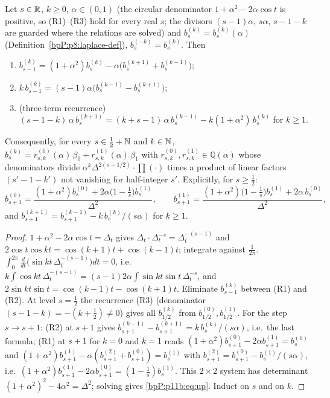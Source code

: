 \begin{lemma}\label{bpP:p11b:laplace-red}
Let $s\in\mathbb{R}$, $k\ge0$, $\alpha\in(0,1)$ (the circular denominator $1+\alpha^2-2\alpha\cos t$ is positive, so (R1)--(R3) hold for every real $s$; the divisors $(s-1)\alpha$, $s\alpha$, $s-1-k$ are guarded where the relations are solved) and $b_s^{(k)}=b_s^{(k)}(\alpha)$ (Definition~\ref{bpP:p8:laplace-def}), $b_s^{(-k)}=b_s^{(k)}$. Then
\begin{enumerate}[label=(R\arabic*)]
\item $b_{s-1}^{(k)}=(1+\alpha^2)b_s^{(k)}-\alpha\big(b_s^{(k+1)}+b_s^{(k-1)}\big)$;
\item $k\,b_{s-1}^{(k)}=(s-1)\alpha\big(b_s^{(k-1)}-b_s^{(k+1)}\big)$;
\item (three-term recurrence) $(s-1-k)\,\alpha\,b_s^{(k+1)}=(k+s-1)\,\alpha\,b_s^{(k-1)}-k(1+\alpha^2)\,b_s^{(k)}$ for $k\ge1$.
\end{enumerate}
Consequently, for every $s\in\tfrac12+\mathbb{N}$ and $k\in\mathbb{N}$, $b_s^{(k)}=r_{s,k}^{(0)}(\alpha)\,\beta_0+r_{s,k}^{(1)}(\alpha)\,\beta_1$ with $r^{(0)}_{s,k},r^{(1)}_{s,k}\in\mathbb Q(\alpha)$ whose denominators divide $\alpha^{k}\Delta^{2(s-1/2)}\cdot\prod(\cdot)$ times a product of linear factors $(s'-1-k')$ not vanishing for half-integer $s'$. Explicitly, for $s\ge\tfrac12$:
\begin{equation}\label{bpP:p11b:eq:up}
b_{s+1}^{(0)}=\frac{(1+\alpha^2)b_s^{(0)}+2\alpha\big(1-\tfrac1s\big)b_s^{(1)}}{\Delta^2},\qquad
b_{s+1}^{(1)}=\frac{(1+\alpha^2)\big(1-\tfrac1s\big)b_s^{(1)}+2\alpha\,b_s^{(0)}}{\Delta^2},
\end{equation}
and $b_{s+1}^{(k+1)}=b_{s+1}^{(k-1)}-k\,b_s^{(k)}/(s\alpha)$ for $k\ge1$.
\end{lemma}
\begin{proof}
\label{stepP:p11b:lr-1} $1+\alpha^2-2\alpha\cos t=\Delta_t$ gives $\Delta_t\cdot\Delta_t^{-s}=\Delta_t^{-(s-1)}$ and $2\cos t\cos kt=\cos(k+1)t+\cos(k-1)t$; integrate against $\frac1{2\pi}$.
\label{stepP:p11b:lr-2} $\int_0^{2\pi}\frac{d}{dt}\big(\sin kt\,\Delta_t^{-(s-1)}\big)dt=0$, i.e.\ $k\int\cos kt\,\Delta_t^{-(s-1)}=(s-1)2\alpha\int\sin kt\sin t\,\Delta_t^{-s}$, and $2\sin kt\sin t=\cos(k-1)t-\cos(k+1)t$.
\label{stepP:p11b:lr-3} Eliminate $b_{s-1}^{(k)}$ between (R1) and (R2).
\label{stepP:p11b:lr-red} At level $s=\tfrac12$ the recurrence (R3) (denominator $(s-1-k)=-(k+\tfrac12)\ne0$) gives all $b_{1/2}^{(k)}$ from $b_{1/2}^{(0)},b_{1/2}^{(1)}$. For the step $s\to s+1$: (R2) at $s+1$ gives $b_{s+1}^{(k-1)}-b_{s+1}^{(k+1)}=k\,b_s^{(k)}/(s\alpha)$, i.e.\ the last formula; (R1) at $s+1$ for $k=0$ and $k=1$ reads $(1+\alpha^2)b_{s+1}^{(0)}-2\alpha b_{s+1}^{(1)}=b_s^{(0)}$ and $(1+\alpha^2)b_{s+1}^{(1)}-\alpha(b_{s+1}^{(2)}+b_{s+1}^{(0)})=b_s^{(1)}$ with $b^{(2)}_{s+1}=b_{s+1}^{(0)}-b_s^{(1)}/(s\alpha)$, i.e.\ $(1+\alpha^2)b_{s+1}^{(1)}-2\alpha b_{s+1}^{(0)}=(1-\frac1s)b_s^{(1)}$. This $2\times2$ system has determinant $(1+\alpha^2)^2-4\alpha^2=\Delta^2$; solving gives \eqref{bpP:p11b:eq:up}. Induct on $s$ and on $k$.
\end{proof}


